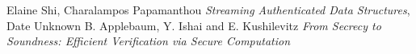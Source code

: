\documentclass[11pt, letterpaper, oneside]{article}
\begin{document}
	



\begin{thebibliography}{9}
	 Elaine Shi, Charalampos Papamanthou \emph{Streaming Authenticated Data Structures}, Date Unknown
	 B. Applebaum, Y. Ishai
and E. Kushilevitz \emph{From Secrecy to Soundness:
Efficient Verification via Secure Computation}
	\end{thebibliography}
\end{document}
